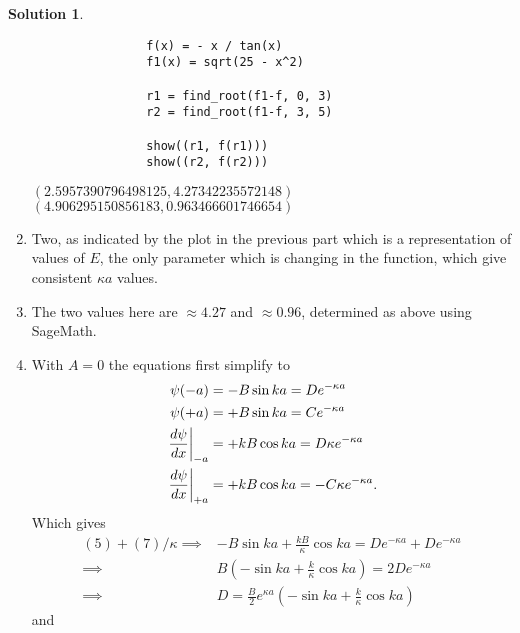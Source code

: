 \documentclass[10pt]{article}
\makeatletter
\theoremstyle{definition}
\newtheorem{soln}{Solution}
\newcommand{\boxspacing}{\kern\kvtcb@left@rule\kern\kvtcb@boxsep}
\newcommand{\prompt}[4]{
    \ttfamily\llap{{\color{#2}[#3]:\hspace{3pt}#4}}\vspace{-\baselineskip}
}
\makeatother
\begin{document}
\begin{soln}
\begin{enumerate}[label=(\alph*)]
\begin{tcolorbox}[breakable, size=fbox, boxrule=1pt, pad at break*=1mm,colback=cellbackground, colframe=cellborder]
\begin{verbatim}
                f(x) = - x / tan(x)
                f1(x) = sqrt(25 - x^2)

                r1 = find_root(f1-f, 0, 3)
                r2 = find_root(f1-f, 3, 5)

                show((r1, f(r1)))
                show((r2, f(r2)))
              \end{verbatim}
          \end{tcolorbox}
          \begin{tcolorbox}[breakable, size=fbox, boxrule=.5pt, pad at break*=1mm, opacityfill=0]
            \prompt{Out}{outcolor}{1}{\boxspacing}
            $\displaystyle \left(2.5957390796498125, 4.27342235572148\right)$\\
            $\displaystyle \left(4.906295150856183, 0.963466601746654\right)$
          \end{tcolorbox}
    \item Two, as indicated by the plot in the previous part which is a representation of values of
          $E$, the only parameter which is changing in the function, which give consistent $\kappa a$ values.
    \item The two values here are $\approx4.27$ and $\approx0.96$, determined as above using SageMath.
    \item With $A=0$ the equations first simplify to
          \begin{align}
            \psi(-a)                     & =- B \sin ka  = De^{-\kappa a}         \\
            \psi(+a)                     & =+ B \sin ka  = Ce^{-\kappa a}         \\
            \eval{\frac{d\psi}{dx}}_{-a} & = +kB\cos ka = D\kappa e^{-\kappa a}   \\
            \eval{\frac{d\psi}{dx}}_{+a} & = +kB\cos ka = -C\kappa e^{-\kappa a}.
          \end{align}
          Which gives
          \begin{align*}
            (5)+(7)/\kappa \implies & - B \sin ka+\frac{kB}{\kappa}\cos ka  = De^{-\kappa a} + De^{-\kappa a}  \\
            \implies                & B\left(-\sin ka+\frac{k}{\kappa}\cos ka\right)  = 2De^{-\kappa a}        \\
            \implies                & D = \frac{B}{2}e^{\kappa a}\left(-\sin ka+\frac{k}{\kappa}\cos ka\right)
          \end{align*}
          and
          \begin{align*}

\end{align*}
\end{enumerate}
\end{soln}
\end{document}

